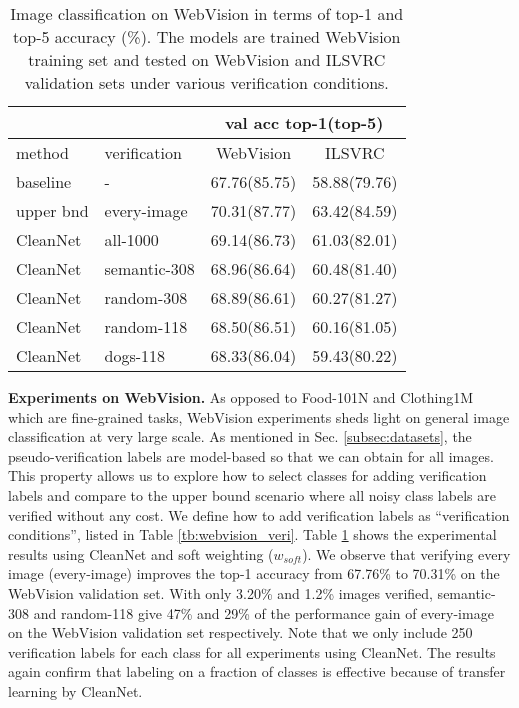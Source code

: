 \documentclass[10pt,twocolumn,letterpaper]{article}
\begin{document}
\begin{table}
\begin{center}
\small
\begin{tabular}{|l|l|c|c|}
\hline
& &\multicolumn{2}{|c|}{val acc top-1(top-5)} \\
\hline
method & verification & WebVision & ILSVRC \\
\hline\hline
baseline & - & 67.76(85.75) & 58.88(79.76) \\
upper bnd & every-image & 70.31(87.77) & 63.42(84.59) \\
\hline
CleanNet & all-1000& 69.14(86.73)  & 61.03(82.01)\\
CleanNet & semantic-308 & 68.96(86.64) & 60.48(81.40)\\
CleanNet & random-308 & 68.89(86.61)  & 60.27(81.27)\\
CleanNet & random-118 & 68.50(86.51)  & 60.16(81.05)\\
CleanNet & dogs-118  & 68.33(86.04)  & 59.43(80.22)\\
\hline
\end{tabular}
\end{center}
\caption{Image classification on WebVision in terms of top-1 and top-5 accuracy (\%). The models are trained WebVision training set and tested on WebVision and ILSVRC validation sets under various verification conditions.}
\label{tb:webvision}
\end{table}

\noindent
\textbf{Experiments on WebVision.} As opposed to Food-101N and Clothing1M which are fine-grained tasks, WebVision experiments sheds light on general image classification at very large scale. As mentioned in Sec. \ref{subsec:datasets}, the pseudo-verification labels are model-based so that we can obtain for all images. This property allows us to explore how to select classes for adding verification labels and compare to the upper bound scenario where all noisy class labels are verified without any cost. We define how to add verification labels as ``verification conditions'', listed in Table \ref{tb:webvision_veri}. Table \ref{tb:webvision} shows the experimental results using CleanNet and soft weighting ($w_{soft}$). We observe that verifying every image (every-image) improves the top-1 accuracy from 67.76\% to 70.31\% on the WebVision validation set. With only 3.20\% and 1.2\% images verified, semantic-308 and random-118 give 47\% and 29\% of the performance gain of every-image on the WebVision validation set respectively. Note that we only include 250 verification labels for each class for all experiments using CleanNet. The results again confirm that labeling on a fraction of classes is effective because of transfer learning by CleanNet.
\end{document}
